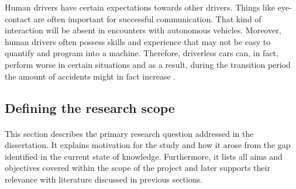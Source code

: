\documentclass[11pt,english,twoside]{article}
\begin{document}
\par
Human drivers have certain expectations towards other drivers. Things like eye-contact are often important for successful communication. That kind of interaction will be absent in encounters with autonomous vehicles. Moreover, human drivers often possess skills and experience that may not be easy to quantify and program into a machine. Therefore, driverless cars can, in fact, perform worse in certain situations and as a result, during the transition period the amount of accidents might in fact increase \citep{sivak2015road}.





















\subsection{Defining the research scope}

\paragraph{}
This section describes the primary research question addressed in the dissertation. It explains motivation for the study and how it arose from the gap identified in the current state of knowledge. Furthermore, it lists all aims and objectives covered within the scope of the project and later supports their relevance with literature discussed in previous sections.
\end{document}
